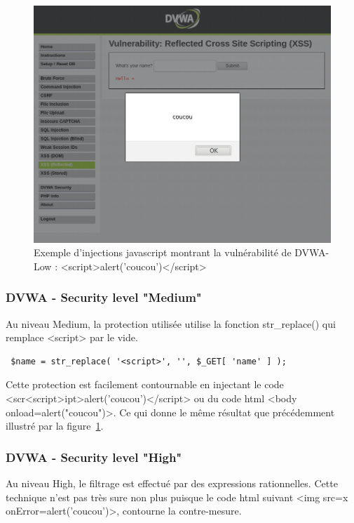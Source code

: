 \begin{figure}[H]
	\begin{center}
		\includegraphics[scale=\scaledvwa]{images/xss/hack2.png}
		\caption{Exemple d'injections javascript montrant la vulnérabilité de DVWA-Low : <script>alert('coucou')</script>} 
		\label{hack2}
	\end{center}
\end{figure}

\subsubsection{DVWA - Security level "Medium"}
Au niveau Medium, la protection utilisée utilise la fonction  str\_replace()
qui remplace <script> par le vide.  
\begin{verbatim}
 $name = str_replace( '<script>', '', $_GET[ 'name' ] ); 
\end{verbatim}
Cette protection est facilement contournable en injectant le code
<scr<script>ipt>alert('coucou')</script> ou du code html <body onload=alert("coucou")>. Ce qui donne le même résultat
que précédemment illustré par la figure~\ref{hack2}. 

\subsubsection{DVWA - Security level "High"}

Au niveau High, le filtrage est effectué par des expressions rationnelles.
Cette technique n'est pas très sure non plus puisque le code html suivant
<img src=x onError=alert('coucou')>, contourne la contre-mesure.


